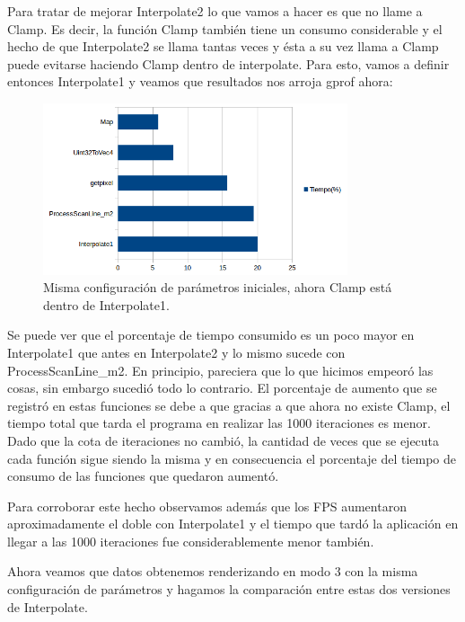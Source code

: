 \documentclass[a4paper]{article}
\begin{document}
Para tratar de mejorar Interpolate2 lo que vamos a hacer es que no llame a Clamp. Es decir, la función Clamp también tiene un consumo considerable y el hecho de que Interpolate2 se llama tantas veces y ésta a su vez llama a Clamp puede evitarse haciendo Clamp dentro de interpolate. Para esto, vamos a definir entonces Interpolate1 y veamos que resultados nos arroja gprof ahora:

\begin{figure}[h]
    \centering
    \includegraphics[width=0.8\textwidth]{Imagenes/gprof2.png}
    \caption{Misma configuración de parámetros iniciales, ahora Clamp está dentro de Interpolate1.}
    \label{fig:mesh1}
\end{figure}

Se puede ver que el porcentaje de tiempo consumido es un poco mayor en Interpolate1 que antes en Interpolate2 y lo mismo sucede con ProcessScanLine_m2. En principio, pareciera que lo que hicimos empeoró las cosas, sin embargo sucedió todo lo contrario. El porcentaje de aumento que se registró en estas funciones se debe a que gracias a que ahora no existe Clamp, el tiempo total que tarda el programa en realizar las 1000 iteraciones es menor. Dado que la cota de iteraciones no cambió, la cantidad de veces que se ejecuta cada función sigue siendo la misma y en consecuencia el porcentaje del tiempo de consumo de las funciones que quedaron aumentó.

Para corroborar este hecho observamos además que los FPS aumentaron aproximadamente el doble con Interpolate1 y el tiempo que tardó la aplicación en llegar a las 1000 iteraciones fue considerablemente menor también.

Ahora veamos que datos obtenemos renderizando en modo 3 con la misma configuración de parámetros y hagamos la comparación entre estas dos versiones de Interpolate.
\end{document}
